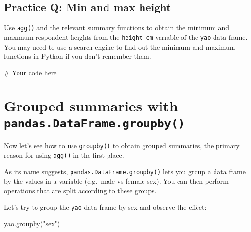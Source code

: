 \documentclass[
  letterpaper,
  DIV=11,
  numbers=noendperiod]{scrreprt}
\newenvironment{Shaded}{\begin{snugshade}}{\end{snugshade}}
\newcommand{\CommentTok}[1]{\textcolor[rgb]{0.37,0.37,0.37}{#1}}
\newcommand{\NormalTok}[1]{\textcolor[rgb]{0.00,0.23,0.31}{#1}}
\newcommand{\StringTok}[1]{\textcolor[rgb]{0.13,0.47,0.30}{#1}}
\begin{document}
\begin{tcolorbox}[enhanced jigsaw, colframe=quarto-callout-tip-color-frame, opacityback=0, titlerule=0mm, bottomrule=.15mm, breakable, leftrule=.75mm, colbacktitle=quarto-callout-tip-color!10!white, title=\textcolor{quarto-callout-tip-color}{\faLightbulb}\hspace{0.5em}{Practice}, rightrule=.15mm, coltitle=black, opacitybacktitle=0.6, colback=white, left=2mm, arc=.35mm, toptitle=1mm, bottomtitle=1mm, toprule=.15mm]

\subsection{Practice Q: Min and max
height}\label{practice-q-min-and-max-height}

Use \texttt{agg()} and the relevant summary functions to obtain the
minimum and maximum respondent heights from the \texttt{height\_cm}
variable of the \texttt{yao} data frame. You may need to use a search
engine to find out the minimum and maximum functions in Python if you
don't remember them.

\begin{Shaded}
\begin{Highlighting}[]
\CommentTok{\# Your code here}
\end{Highlighting}
\end{Shaded}

\end{tcolorbox}

\section{\texorpdfstring{Grouped summaries with
\texttt{pandas.DataFrame.groupby()}}{Grouped summaries with pandas.DataFrame.groupby()}}\label{grouped-summaries-with-pandas.dataframe.groupby}

Now let's see how to use \texttt{groupby()} to obtain grouped summaries,
the primary reason for using \texttt{agg()} in the first place.

As its name suggests, \texttt{pandas.DataFrame.groupby()} lets you group
a data frame by the values in a variable (e.g.~male vs female sex). You
can then perform operations that are split according to these groups.

Let's try to group the \texttt{yao} data frame by sex and observe the
effect:

\begin{Shaded}
\begin{Highlighting}[]
\NormalTok{yao.groupby(}\StringTok{"sex"}\NormalTok{)}
\end{Highlighting}
\end{Shaded}
\end{document}
